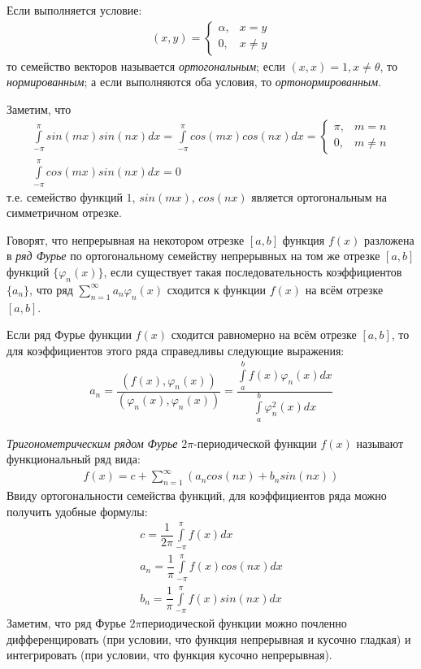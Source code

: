 \documentclass[a4paper]{article}
\begin{document}
Если выполняется условие:
\begin{gather*}
    (x, y) = \left\{\begin{matrix}
        \alpha, & x = y \\
        0, & x \not= y
    \end{matrix}\right.
\end{gather*}
то семейство векторов называется {\it ортогональным};
если $(x, x) = 1, x \not= \theta$, то {\it нормированным};
а если выполняются оба условия, то {\it ортонормированным}.

Заметим, что
\begin{gather*}
    \int\limits_{-\pi}^\pi sin(mx)sin(nx)dx = \int\limits_{-\pi}^\pi cos(mx)cos(nx)dx = \left\{\begin{matrix}
        \pi, & m = n \\
        0, & m \not= n
    \end{matrix}\right. \\
    \int\limits_{-\pi}^\pi cos(mx)sin(nx)dx = 0
\end{gather*}
т.е. семейство функций $1$, $sin(mx)$, $cos(nx)$
является ортогональным на симметричном отрезке.

Говорят, что непрерывная на некотором отрезке $[a, b]$ функция $f(x)$ разложена в {\it ряд Фурье}
по ортогональному семейству непрерывных на том же отрезке $[a, b]$ функций $\{\varphi_n(x)\}$,
если существует такая последовательность коэффициентов $\{a_n\}$,
что ряд $\sum\limits_{n = 1}^{\infty}a_n\varphi_n(x)$
сходится к функции $f(x)$ на всём отрезке $[a, b]$.

Если ряд Фурье функции $f(x)$ сходится равномерно на всём отрезке $[a, b]$,
то для коэффициентов этого ряда справедливы следующие выражения:
\begin{gather*}
    a_n = \dfrac{(f(x), \varphi_n(x))}{(\varphi_n(x), \varphi_n(x))} = \dfrac{\int\limits_a^b f(x)\varphi_n(x)dx}{\int\limits_a^b \varphi_n^2(x)dx}
\end{gather*}

{\it Тригонометрическим рядом Фурье} $2\pi$-периодической функции $f(x)$ называют функциональный ряд вида:
\begin{gather*}
    f(x) = c + \sum\limits_{n=1}^{\infty}(a_n cos(nx) + b_n sin(nx))
\end{gather*}
Ввиду ортогональности семейства функций, для коэффициентов ряда можно получить удобные формулы:
\begin{gather*}
    c = \dfrac{1}{2\pi}\int\limits_{-\pi}^\pi f(x)dx \\
    a_n = \dfrac{1}{\pi}\int\limits_{-\pi}^\pi f(x)cos(nx)dx \\
    b_n = \dfrac{1}{\pi}\int\limits_{-\pi}^\pi f(x)sin(nx)dx
\end{gather*}
Заметим, что ряд Фурье $2\pi$периодической функции можно почленно
дифференцировать (при условии, что функция непрерывная и кусочно гладкая)
и интегрировать (при условии, что функция кусочно непрерывная).
\end{document}
